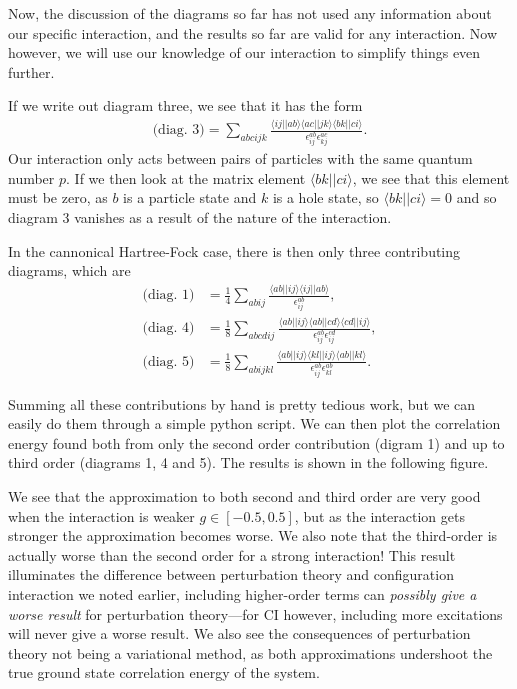 \documentclass[a4paper, 11pt, notitlepage, english]{article}
\newcommand{\brakket}[2]{\langle #1 || #2 \rangle}
\newcommand{\eps}{\epsilon}
\begin{document}
Now, the discussion of the diagrams so far has not used any information about our specific interaction, and the results so far are valid for any interaction. Now however, we will use our knowledge of our interaction to simplify things even further.

If we write out diagram three, we see that it has the form
\begin{align*}
    \mbox{(diag.\ 3)} = \sum_{abcijk}\frac{\brakket{ij}{ab}\brakket{ac}{jk}\brakket{bk}{ci}}{\eps_{ij}^{ab}\eps_{kj}^{ac}}.
\end{align*}
Our interaction only acts between pairs of particles with the same quantum number $p$. If we then look at the matrix element $\brakket{bk}{ci}$, we see that this element must be zero, as $b$ is a particle state and $k$ is a hole state, so $\brakket{bk}{ci} = 0$ and so diagram 3 vanishes as a result of the nature of the interaction.

In the cannonical Hartree-Fock case, there is then only three contributing diagrams, which are
\begin{align*}
    \mbox{(diag.\ 1)} &= \frac{1}{4}\sum_{abij}\frac{\brakket{ab}{ij}\brakket{ij}{ab}}{\eps_{ij}^{ab}}, \\
    \mbox{(diag.\ 4)} &= \frac{1}{8}\sum_{abcdij}\frac{\brakket{ab}{ij}\brakket{ab}{cd}\brakket{cd}{ij}}{\eps_{ij}^{ab}\eps_{ij}^{cd}},\\
    \mbox{(diag.\ 5)} &= \frac{1}{8}\sum_{abijkl}\frac{\brakket{ab}{ij}\brakket{kl}{ij}\brakket{ab}{kl}}{\eps_{ij}^{ab}\eps_{kl}^{ab}}.
\end{align*}

Summing all these contributions by hand is pretty tedious work, but we can easily do them through a simple python script. We can then plot the correlation energy found both from only the second order contribution (digram 1) and up to third order (diagrams 1, 4 and 5). The results is shown in the following figure.

We see that the approximation to both second and third order are very good when the interaction is weaker $g\in[-0.5,0.5]$, but as the interaction gets stronger the approximation becomes worse. We also note that the third-order is actually worse than the second order for a strong interaction! This result illuminates the difference between perturbation theory and configuration interaction we noted earlier, including higher-order terms can \emph{possibly give a worse result} for perturbation theory---for CI however, including more excitations will never give a worse result. We also see the consequences of perturbation theory not being a variational method, as both approximations undershoot the true ground state correlation energy of the system.
\end{document}
